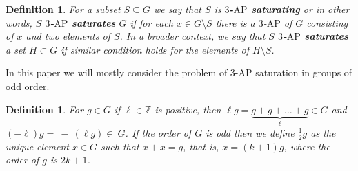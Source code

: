 \documentclass[11pt]{article}
\numberwithin{table}{section}
\newtheorem{definition}[theorem]{Definition}
\theoremstyle{definition}
\begin{document}
	
	\begin{definition}
		For a subset $S\subseteq G$ we say that $S$ is\textbf{ $3$-$\mathrm{AP}$ saturating } or in other words, $S$ \textbf{$3$-$\mathrm{AP}$ saturates } $G$  if for each $x \in G \setminus S$  there is a $3$-$\mathrm{AP}$ of $G$ consisting of $x$ and two  elements of $S$. %
		In a broader context, we say that $S$ \textbf{$3$-$\mathrm{AP}$ saturates } 
		a set $H\subset G$ if similar condition holds for the elements of $H\setminus S$.
	\end{definition}
	\vspace{-0.2cm}
	In this paper we will mostly consider the problem of $3$-$\mathrm{AP}$ saturation in groups of odd order. 
	\vspace{-0.2cm}
	\begin{definition}
		For $g\in G$ if $\ell\in \mathbb{Z}$ is positive, then $\ell g= \underbrace{g+g+\ldots+g}_{\ell} \in G$ and $(-\ell)g=~-~(\ell g)\in ~G$. 
		If the order of $G$ is odd then we define $\frac12 g$ as the unique element $x\in G$ such that $x+x=g$, that is,  $x=(k+1)g$, where the order of $g$ is $2k+1$.
	\end{definition}
	
	
\end{document}

